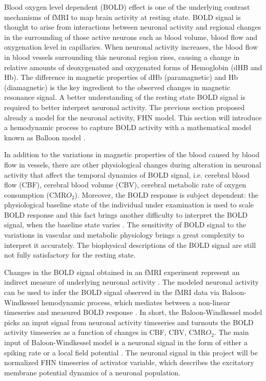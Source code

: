 Blood oxygen level dependent (BOLD) effect is one of the underlying contrast mechanisms of fMRI to map brain activity at resting state. BOLD signal is thought to arise from interactions between neuronal activity and regional changes in the surrounding of those active neurons such as blood volume, blood flow and  oxygenation level in capillaries. When neuronal activity increases, the blood flow in blood vessels surrounding this neuronal region rises, causing a change in relative amounts of deoxygenated and oxygenated forms of Hemoglobin (dHB and Hb). The difference in magnetic properties of dHb (paramagnetic) and Hb (diamagnetic) is the key ingredient to the observed changes in magnetic resonance signal. A better understanding of the resting state BOLD signal is required to better interpret neuronal activity. The previous section proposed already a model for the neuronal activity, FHN model. This section will introduce a hemodynamic process to capture BOLD activity with a mathematical model known as Balloon model \citep{XYZ98}. 

In addition to the variations in magnetic properties of the blood caused by blood flow in vessels, there are other physiological changes during alteration in neuronal activity that affect the temporal dynamics of BOLD signal, i.e. cerebral blood flow (CBF), cerebral blood volume (CBV), cerebral metabolic rate of oxygen consumption (CMR$O_2$). Moreover, the BOLD response is subject dependent: the physiological baseline state of the individual under examination is used to scale BOLD response and this fact brings another difficulty to interpret the BOLD signal, when the baseline state varies \citep{XYZ2013}. The sensitivity of BOLD signal to the variations in vascular and metabolic physiology brings a great complexity to interpret it accurately. The biophysical descriptions of the BOLD signal are still not fully satisfactory for the resting state. 

Changes in the BOLD signal obtained in an fMRI experiment represent an indirect measure of underlying neuronal activity \citep{VUK14}. The modeled neuronal activity can be used to infer the BOLD signal observed in the fMRI data via Baloon-Windkessel hemodynamic process, which mediates between a non-linear timeseries and measured BOLD response \citep{FRI00}. In short, the Baloon-Windkessel model picks an input signal from neuronal activity timeseries and turnouts the BOLD activity timeseries as a function of changes in CBF, CBV, CMR$O_2$. The main input of Baloon-Windkessel model is a neuronal signal in the form of either a spiking rate or a local field potential \citep{SET12}. The neuronal signal in this project will be normalized FHN timeseries of activator variable, which describes the excitatory membrane potential dynamics of a neuronal population.       

